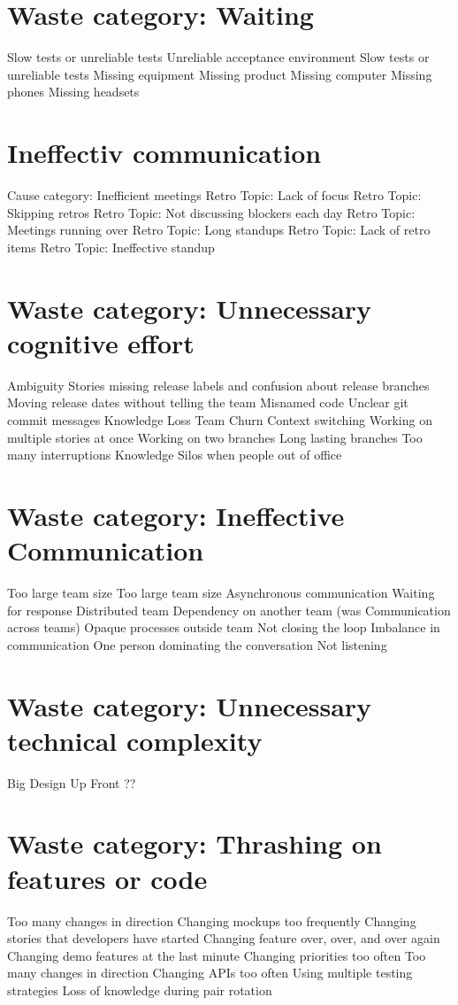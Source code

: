 \section{Waste category: Waiting}
Slow tests or unreliable tests
Unreliable acceptance environment
Slow tests or unreliable tests
Missing equipment
Missing product
Missing computer
Missing phones
Missing headsets

\section{Ineffectiv communication}

\quad Cause category: Inefficient meetings
\quad \quad Retro Topic: Lack of focus
\quad \quad Retro Topic: Skipping retros
\quad \quad Retro Topic: Not discussing blockers each day
\quad \quad Retro Topic: Meetings running over
\quad \quad Retro Topic: Long standups
\quad \quad Retro Topic: Lack of retro items
\quad \quad Retro Topic: Ineffective standup

\section{Waste category: Unnecessary cognitive effort}
Ambiguity
Stories missing release labels and confusion about release branches
Moving release dates without telling the team
Misnamed code
Unclear git commit messages
Knowledge Loss
Team Churn
Context switching
Working on multiple stories at once
Working on two branches
Long lasting branches
Too many interruptions
Knowledge Silos when people out of office
\section{Waste category: Ineffective Communication}
Too large team size
Too large team size
Asynchronous communication
Waiting for response
Distributed team
Dependency on another team (was Communication across teams)
Opaque processes outside team
Not closing the loop
Imbalance in communication
One person dominating the conversation
Not listening


\section{Waste category: Unnecessary technical complexity}

Big Design Up Front
??
\section{Waste category: Thrashing on features or code}
Too many changes in direction
Changing mockups too frequently
Changing stories that developers have started
Changing feature over, over, and over again
Changing demo features at the last minute
Changing priorities too often
Too many changes in direction
Changing APIs too often
Using multiple testing strategies
Loss of knowledge during pair rotation
